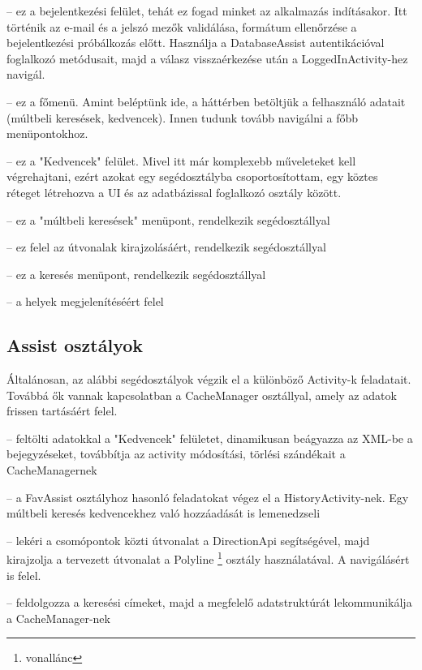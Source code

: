 \begin{description}
	\setlength{\itemsep}{0.04mm}
	\item[LoginTabActivity] -- ez a bejelentkezési felület, tehát ez fogad minket az alkalmazás indításakor. Itt történik az e-mail és a jelszó mezők validálása, formátum ellenőrzése a bejelentkezési próbálkozás előtt. Használja a DatabaseAssist autentikációval foglalkozó metódusait, majd a válasz visszaérkezése után a LoggedInActivity-hez navigál.
	\item[LoggedInActivity] -- ez a főmenü. Amint beléptünk ide, a háttérben betöltjük a felhasználó adatait (múltbeli keresések, kedvencek). Innen tudunk tovább navigálni a főbb menüpontokhoz.
	\item[FavActivity] --  ez a "Kedvencek" felület. Mivel itt már komplexebb műveleteket kell végrehajtani, ezért azokat egy segédosztályba csoportosítottam, egy köztes réteget létrehozva a UI és az adatbázissal foglalkozó osztály között.
	\item[HistoryActivity] -- ez a "múltbeli keresések" menüpont, rendelkezik segédosztállyal 
	\item[MultiRouteActivity] -- ez felel az útvonalak kirajzolásáért, rendelkezik segédosztállyal 
	\item[SearchActivity] -- ez a keresés menüpont, rendelkezik segédosztállyal 
	\item[ShowMapActivity] -- a helyek megjelenítéséért felel
\end{description}

\subsection{Assist osztályok}\label{sec:ALAP:adatelem}

Általánosan, az alábbi segédosztályok végzik el a különböző Activity-k feladatait. Továbbá ők vannak kapcsolatban a CacheManager osztállyal, amely az adatok frissen tartásáért felel.

\begin{description}
	\setlength{\itemsep}{0.04mm}
	\item[FavAssist] -- feltölti adatokkal a "Kedvencek" felületet, dinamikusan beágyazza az XML-be a bejegyzéseket, továbbítja az activity módosítási, törlési szándékait a CacheManagernek
	\item[HistoryAssist] -- a FavAssist osztályhoz hasonló feladatokat végez el a HistoryActivity-nek. Egy múltbeli keresés kedvencekhez való hozzáadását is lemenedzseli
	\item[MultiRoutAssist] -- lekéri a csomópontok közti útvonalat a DirectionApi segítségével, majd kirajzolja a tervezett útvonalat a Polyline%
	\footnote{ %
		vonallánc
	}  %
 osztály használatával. A navigálásért is felel.
	\item[SearchAssist] -- feldolgozza a keresési címeket, majd a megfelelő adatstruktúrát lekommunikálja a CacheManager-nek
\end{description}


